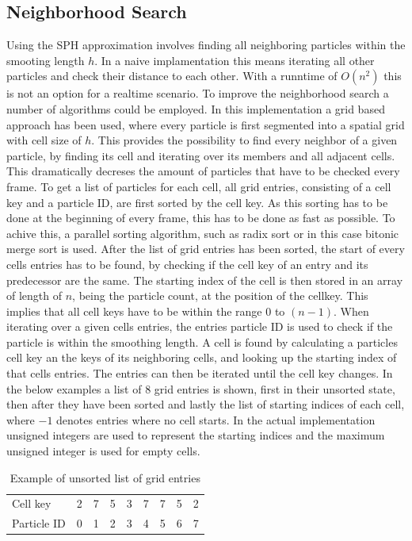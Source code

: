 \documentclass[intern]{cgMA}
\begin{document}
    \subsection{Neighborhood Search}
    Using the SPH approximation involves finding all neighboring particles within the smooting length $h$. In a naive implamentation this means iterating all other particles and check their distance to each other. With a runntime of $O(n^2)$ this is not an option for a realtime scenario. To improve the neighborhood search a number of algorithms could be employed. In this implementation a grid based approach has been used, where every particle is first segmented into a spatial grid with cell size of $h$. This provides the possibility to find every neighbor of a given particle, by finding its cell and iterating over its members and all adjacent cells. This dramatically decreses the amount of particles that have to be checked every frame. To get a list of particles for each cell, all grid entries, consisting of a cell key and a particle ID, are first sorted by the cell key. As this sorting has to be done at the beginning of every frame, this has to be done as fast as possible. To achive this, a parallel sorting algorithm, such as radix sort or in this case bitonic merge sort is used. After the list of grid entries has been sorted, the start of every cells entries has to be found, by checking if the cell key of an entry and its predecessor are the same. The starting index of the cell is then stored in an array of length of $n$, being the particle count, at the position of the cellkey. This implies that all cell keys have to be within the range $0$ to $(n - 1)$. 
    When iterating over a given cells entries, the entries particle ID is used to check if the particle is within the smoothing length. A cell is found by calculating a particles cell key an the keys of its neighboring cells, and looking up the starting index of that cells entries. The entries can then be iterated until the cell key changes. In the below examples a list of 8 grid entries is shown, first in their unsorted state, then after they have been sorted and lastly the list of starting indices of each cell, where $-1$ denotes entries where no cell starts. In the actual implementation unsigned integers are used to represent the starting indices and the maximum unsigned integer is used for empty cells. \cite{psuc} \cite{seblague} \cite{bitonic}
    
    \begin{table}[ht]
        \centering
        \caption{Example of unsorted list of grid entries }
        \begin{tabular}{ l c c c c c c c c }
            Cell key    & 2 & 7 & 5 & 3 & 7 & 7 & 5 & 2 \\ 
            Particle ID & 0 & 1 & 2 & 3 & 4 & 5 & 6 & 7 \\   
        \end{tabular}
    \end{table}
\end{document}

